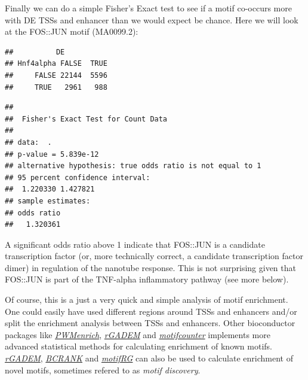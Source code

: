 \documentclass[9pt,a4paper,]{extarticle}
\newenvironment{Shaded}{\begin{snugshade}}{\end{snugshade}}
\newcommand{\KeywordTok}[1]{\textcolor[rgb]{0.13,0.29,0.53}{\textbf{{#1}}}}
\newcommand{\DataTypeTok}[1]{\textcolor[rgb]{0.13,0.29,0.53}{{#1}}}
\newcommand{\FloatTok}[1]{\textcolor[rgb]{0.00,0.00,0.81}{{#1}}}
\newcommand{\StringTok}[1]{\textcolor[rgb]{0.31,0.60,0.02}{{#1}}}
\newcommand{\CommentTok}[1]{\textcolor[rgb]{0.56,0.35,0.01}{\textit{{#1}}}}
\newcommand{\NormalTok}[1]{{#1}}
\begin{document}
Finally we can do a simple Fisher's Exact test to see if a motif co-occurs more with DE TSSs and enhancer than we would expect be chance. Here we will look at the FOS::JUN motif (MA0099.2):

\begin{Shaded}
\end{Shaded}

\begin{verbatim}
##          DE
## Hnf4alpha FALSE  TRUE
##     FALSE 22144  5596
##     TRUE   2961   988
\end{verbatim}

\begin{verbatim}
## 
##  Fisher's Exact Test for Count Data
## 
## data:  .
## p-value = 5.839e-12
## alternative hypothesis: true odds ratio is not equal to 1
## 95 percent confidence interval:
##  1.220330 1.427821
## sample estimates:
## odds ratio 
##   1.320361
\end{verbatim}

A significant odds ratio above 1 indicate that FOS::JUN is a candidate transcription factor (or, more technically correct, a candidate transcription factor dimer) in regulation of the nanotube response. This is not surprising given that FOS::JUN is part of the TNF-alpha inflammatory pathway (see more below).

Of course, this is a just a very quick and simple analysis of motif enrichment. One could easily have used different regions around TSSs and enhancers and/or split the enrichment analysis between TSSs and enhancers. Other bioconductor packages like \emph{\href{https://bioconductor.org/packages/3.8/PWMenrich}{PWMenrich}}, \emph{\href{https://bioconductor.org/packages/3.8/rGADEM}{rGADEM}} and \emph{\href{https://bioconductor.org/packages/3.8/motifcounter}{motifcounter}} implements more advanced statistical methods for calculating enrichment of known motifs. \emph{\href{https://bioconductor.org/packages/3.8/rGADEM}{rGADEM}}, \emph{\href{https://bioconductor.org/packages/3.8/BCRANK}{BCRANK}} and \emph{\href{https://bioconductor.org/packages/3.8/motifRG}{motifRG}} can also be used to calculate enrichment of novel motifs, sometimes refered to as \emph{motif discovery}.
\end{document}
